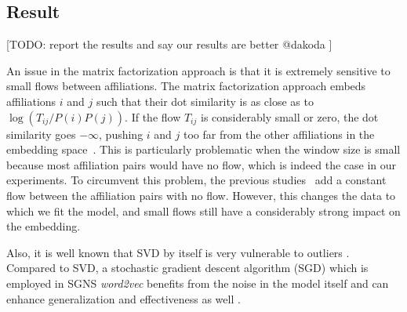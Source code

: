 \documentclass[12pt,a4paper]{article}
\newcommand{\todo}[1]{{\leavevmode\color{orange}[TODO: #1]}}
\begin{document}
\subsection{Result}
\todo{report the results and say our results are better @dakoda
}


An issue in the matrix factorization approach is that it is extremely sensitive to small flows between affiliations. The matrix factorization approach embeds affiliations $i$ and $j$ such that their dot similarity is as close as to $\log (T_{ij} / P(i) P(j))$. If the flow $T_{ij}$ is considerably small or zero, the dot similarity goes $-\infty$, pushing $i$ and $j$ too far from the other affiliations in the embedding space~\autocite{levy2014neural, Qui2018}. This is particularly problematic when the window size is small because most affiliation pairs would have no flow, which is indeed the case in our experiments. To circumvent this problem, the previous studies~\autocite{levy2014neural, Qui2018} add a constant flow between the affiliation pairs with no flow. However, this changes the data to which we fit the model, and small flows still have a considerably strong impact on the embedding. 

Also, it is well known that SVD by itself is very vulnerable to outliers \autocite{ xu2012robust, huber1981robust, xu1995robust, chandrasekaran2011rank, candes2011robust, }. Compared to SVD, a stochastic gradient descent algorithm (SGD) which is employed in SGNS \textit{word2vec} benefits from the noise in the model itself and can enhance generalization and effectiveness as well \autocite{ma2018power, smith2020generalization, zhang2019algorithmic,}.
\end{document}
